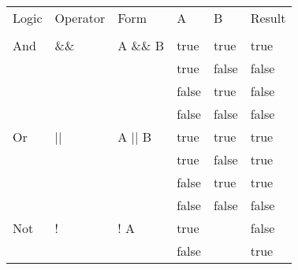 \documentclass[en, 11pt, xcolor=dvipsnames]{beamer}
\begin{document}
\begin{frame}[fragile]


	\begin{columns}[c]
		\begin{column}{0.98\textwidth}

			\center\scriptsize
			\begin{table}
				\begin{tabular}{l l l l l l}
					Logic & Operator & Form     & A     & B     & Result \\
					      &          &          &       &       &        \\
					And   & \&\&     & A \&\& B & true  & true  & true   \\
					      &          &          & true  & false & false  \\
					      &          &          & false & true  & false  \\
					      &          &          & false & false & false  \\
					Or    & ||       & A || B   & true  & true  & true   \\
					      &          &          & true  & false & true   \\
					      &          &          & false & true  & true   \\
					      &          &          & false & false & false  \\
					Not   & !        & ! A      & true  &       & false  \\
					      &          &          & false &       & true   \\
				\end{tabular}
			\end{table}

		\end{column}
	\end{columns}

\end{frame}
\end{document}
